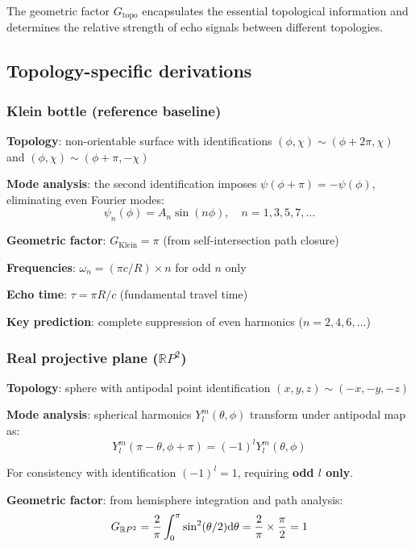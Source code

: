 \documentclass[12pt]{article}
\begin{document}
The geometric factor $G_{\mathrm{topo}}$ encapsulates the essential topological information and determines the relative strength of echo signals between different topologies.

\subsection{Topology-specific derivations}

\subsubsection{Klein bottle (reference baseline)}

\textbf{Topology}: non-orientable surface with identifications $(\phi, \chi) \sim (\phi + 2\pi, \chi)$ and $(\phi, \chi) \sim (\phi + \pi, -\chi)$

\textbf{Mode analysis}: the second identification imposes $\psi(\phi+\pi) = -\psi(\phi)$, eliminating even Fourier modes:
\begin{equation}
\psi_n(\phi) = A_n \sin(n\phi), \quad n = 1, 3, 5, 7, \ldots
\end{equation}

\textbf{Geometric factor}: $G_{\mathrm{Klein}} = \pi$ (from self-intersection path closure)

\textbf{Frequencies}: $\omega_n = (\pi c/R) \times n$ for odd $n$ only

\textbf{Echo time}: $\tau = \pi R/c$ (fundamental travel time)

\textbf{Key prediction}: complete suppression of even harmonics ($n = 2, 4, 6, \ldots$)

\subsubsection{Real projective plane ($\mathbb{R}P^2$)}

\textbf{Topology}: sphere with antipodal point identification $(x,y,z) \sim (-x,-y,-z)$

\textbf{Mode analysis}: spherical harmonics $Y_l^m(\theta,\phi)$ transform under antipodal map as:
\begin{equation}
Y_l^m(\pi-\theta, \phi+\pi) = (-1)^l Y_l^m(\theta,\phi)
\end{equation}

For consistency with identification $(-1)^l = 1$, requiring \textbf{odd $l$ only}.

\textbf{Geometric factor}: from hemisphere integration and path analysis:
\begin{equation}
G_{\mathbb{R}P^2} = \frac{2}{\pi} \int_0^\pi \sin^2(\theta/2) {\rm d}\theta = \frac{2}{\pi} \times \frac{\pi}{2} = 1
\end{equation}
\end{document}
